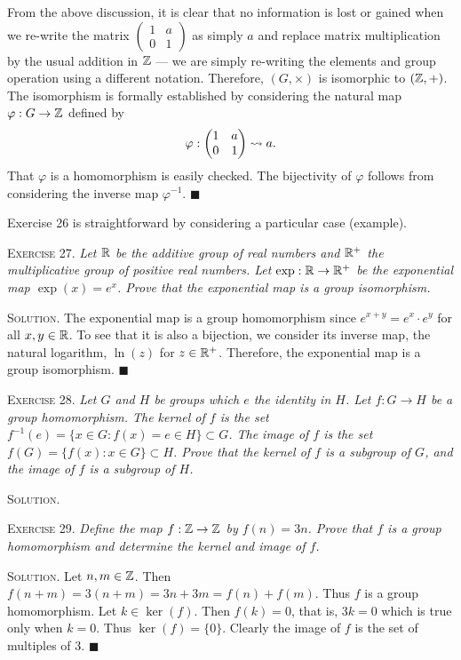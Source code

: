 \documentclass[11pt, leqno]{article}
\newcommand{\done}{\ensuremath{\blacksquare}}
\begin{document}
From the above discussion, it is clear that no information is lost or gained when we re-write the matrix $\displaystyle \begin{pmatrix} 1 & a \\ 0 & 1 \end{pmatrix}$ as simply $a$ and replace matrix multiplication by the usual addition in $\mathbb{Z}$ --- we are simply re-writing the elements and group operation using a different notation. Therefore, $(G, \times)$ is isomorphic to $(\mathbb{Z}, +)$. The isomorphism is formally established by considering the natural map $\varphi : G \to \mathbb{Z}$ defined by 
\begin{displaymath}
\varphi: \begin{pmatrix} 1 & a \\ 0 & 1 \end{pmatrix} \rightsquigarrow a.
\end{displaymath}
That $\varphi$ is a homomorphism is easily checked. The bijectivity of $\varphi$ follows from considering the inverse map $\varphi^{-1}$. \done

Exercise 26 is straightforward by considering a particular case (example).

\textsc{Exercise 27}. \emph{Let $\mathbb{R}$ be the additive group of real numbers and $\mathbb{R}^+$ the multiplicative group of positive real numbers. Let $\exp: \mathbb{R} \to \mathbb{R}^+$ be the exponential map $\exp(x) = e^x$. Prove that the exponential map is a group isomorphism.}

\textsc{Solution}. The exponential map is a group homomorphism since $e^{x+y}=e^x\cdot e^y$ for all $x,y \in \mathbb{R}$. To see that it is also a bijection, we consider its inverse map, the natural logarithm, $\ln(z)$ for $z\in\mathbb{R}^+$. Therefore, the exponential map is a group isomorphism. \done

\textsc{Exercise 28}. \emph{Let $G$ and $H$ be groups which $e$ the identity in $H$. Let $f:G\to H$ be a group homomorphism. The kernel of $f$ is the set $f^{-1}(e) = \{x\in G : f(x) = e \in H \} \subset G$. The image of $f$ is the set $f(G) = \{f(x) : x\in G\} \subset H$. Prove that the kernel of $f$ is a subgroup of $G$, and the image of $f$ is a subgroup of $H$.}

\textsc{Solution}.

\textsc{Exercise 29}. \emph{Define the map $f: \mathbb{Z} \to \mathbb{Z}$ by $f(n)=3n$. Prove that $f$ is a group homomorphism and determine the kernel and image of $f$.}

\textsc{Solution}. Let $n,m \in \mathbb{Z}$. Then $f(n+m) = 3(n+m) = 3n + 3m = f(n) + f(m)$. Thus $f$ is a group homomorphism. Let $k\in \ker(f)$. Then $f(k) = 0$, that is, $3k = 0$ which is true only when $k=0$. Thus $\ker(f) = \{0\}$. Clearly the image of $f$ is the set of multiples of $3$. \done
\end{document}
